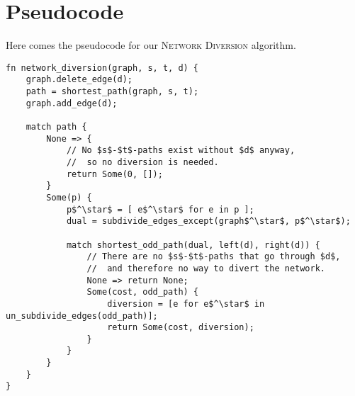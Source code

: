 \section{Pseudocode}
Here comes the pseudocode for our \textsc{Network Diversion} algorithm.

\begin{lstlisting}[caption={Main},label=Listing,mathescape=true]
fn network_diversion(graph, s, t, d) {
    graph.delete_edge(d);
    path = shortest_path(graph, s, t);
    graph.add_edge(d);

    match path {
        None => {
            // No $s$-$t$-paths exist without $d$ anyway,
            //  so no diversion is needed.
            return Some(0, []);
        }
        Some(p) {
            p$^\star$ = [ e$^\star$ for e in p ];
            dual = subdivide_edges_except(graph$^\star$, p$^\star$);

            match shortest_odd_path(dual, left(d), right(d)) {
                // There are no $s$-$t$-paths that go through $d$,
                //  and therefore no way to divert the network.
                None => return None;
                Some(cost, odd_path) {
                    diversion = [e for e$^\star$ in un_subdivide_edges(odd_path)];
                    return Some(cost, diversion);
                }
            }
        }
    }
}
\end{lstlisting}
